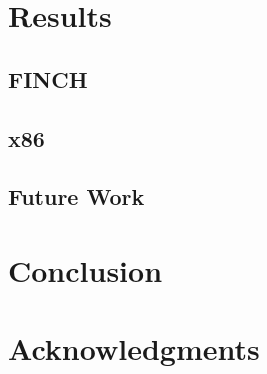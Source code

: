 \documentclass{sig-alternate}
\begin{document}
\section{Results}
\subsection{FINCH}
\subsection{x86}

\subsection{Future Work}

\section{Conclusion}


\section{Acknowledgments}


%

%
%
\end{document}
